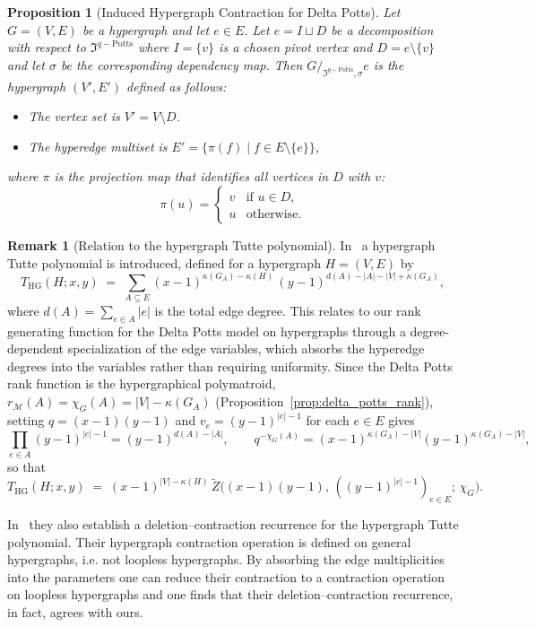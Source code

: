 \documentclass[11pt,reqno]{amsart}
\newcommand{\Mo}{\mathcal{M}}
\newcommand{\mcp}{\mathfrak{I}^{q-\mathrm{Potts}}}
\theoremstyle{plain}
\newtheorem{proposition}[theorem]{Proposition}
\theoremstyle{definition}
\newtheorem{remark}[theorem]{Remark}
\numberwithin{equation}{section}
\begin{document}
\begin{proposition}[Induced Hypergraph Contraction for Delta Potts]
    \label{prop:potts_contraction}
    Let $G=(V,E)$ be a hypergraph and let $e \in E$. Let $e = I \sqcup D$ be a decomposition with respect to $\mcp$ where $I = \{v\}$ is a chosen pivot vertex and $D = e \setminus \{v\}$ and let $\sigma$ be the corresponding dependency map. Then $G/_{\mcp, \sigma}e$ is the hypergraph $(V', E')$ defined as follows:
    \begin{itemize}
        \item The vertex set is $V' = V \setminus D$.
        \item The hyperedge multiset is $E' = \{ \pi(f) \mid f \in E \setminus \{e\} \}$,
    \end{itemize}
    where $\pi$ is the projection map that identifies all vertices in $D$ with $v$:
    \[
    \pi(u) = \begin{cases}
        v & \text{if } u \in D, \\
        u & \text{otherwise}.
    \end{cases}
    \]
\end{proposition}

\begin{remark}[Relation to the hypergraph Tutte polynomial]
\label{rem:potts_contraction_bem}
In~\cite{Berrekkal2026} a hypergraph Tutte polynomial is introduced,
defined for a hypergraph $H = (V,E)$ by
\[
    T_{\mathrm{HG}}(H; x, y)
    \;=\;
    \sum_{A \subseteq E} (x-1)^{\kappa(G_A) - \kappa(H)}\,
    (y-1)^{d(A) - |A| - |V| + \kappa(G_A)},
\]
where $d(A) = \sum_{e \in A} |e|$ is the total edge degree. This relates
to our rank generating function for the Delta Potts model on
hypergraphs through a degree-dependent specialization of the edge
variables, which absorbs the hyperedge degrees into the variables rather
than requiring uniformity. Since the Delta Potts rank function is the
hypergraphical polymatroid, $r_\Mo(A) = \chi_G(A) = |V| - \kappa(G_A)$
(Proposition~\ref{prop:delta_potts_rank}), setting $q = (x-1)(y-1)$ and
$v_e = (y-1)^{|e|-1}$ for each $e \in E$ gives
\[
    \prod_{e \in A} (y-1)^{|e|-1} = (y-1)^{d(A) - |A|},
    \qquad
    q^{-\chi_G(A)} = (x-1)^{\kappa(G_A) - |V|} (y-1)^{\kappa(G_A) - |V|},
\]
so that
\[
    T_{\mathrm{HG}}(H; x, y)
    \;=\;
    (x-1)^{|V| - \kappa(H)}\,
    \widetilde Z\!\bigl( (x-1)(y-1),\, ((y-1)^{|e|-1})_{e \in E};\, \chi_G \bigr).
\]

In~\cite{Berrekkal2026} they also establish a deletion--contraction recurrence for the hypergraph Tutte polynomial. Their hypergraph contraction operation is defined on general hypergraphs, i.e. not loopless hypergraphs. By absorbing the edge multiplicities into the parameters one can reduce their contraction to a contraction operation on loopless hypergraphs and one finds that their deletion--contraction recurrence, in fact, agrees with ours.   
\end{remark}
\end{document}
